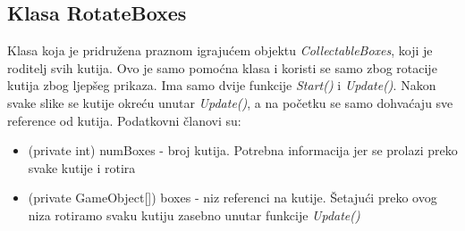 \subsection{Klasa RotateBoxes}
Klasa koja je pridružena praznom igrajućem objektu \emph{CollectableBoxes}, koji je roditelj svih kutija. Ovo je samo pomoćna klasa i koristi se samo zbog rotacije kutija zbog ljepšeg prikaza. Ima samo dvije funkcije \emph{Start()} i \emph{Update()}. Nakon svake slike se kutije okreću unutar \emph{Update()}, a na početku se samo dohvaćaju sve reference od kutija. Podatkovni članovi su:
\begin{itemize}
	\item (private int) numBoxes - broj kutija. Potrebna informacija jer se prolazi preko svake kutije i rotira
	\item (private GameObject[]) boxes - niz referenci na kutije. Šetajući preko ovog niza rotiramo svaku kutiju zasebno unutar funkcije \emph{Update()} 
\end{itemize}